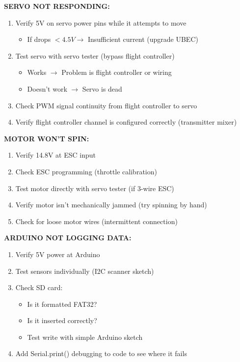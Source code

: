 \documentclass[11pt,letterpaper]{article}
\begin{document}
\textbf{SERVO NOT RESPONDING:}
\begin{enumerate}
\item Verify 5V on servo power pins while it attempts to move
\begin{itemize}[nosep]
\item If drops $< 4.5V \rightarrow$ Insufficient current (upgrade UBEC)
\end{itemize}
\item Test servo with servo tester (bypass flight controller)
\begin{itemize}[nosep]
\item Works $\rightarrow$ Problem is flight controller or wiring
\item Doesn't work $\rightarrow$ Servo is dead
\end{itemize}
\item Check PWM signal continuity from flight controller to servo
\item Verify flight controller channel is configured correctly (transmitter mixer)
\end{enumerate}

\textbf{MOTOR WON'T SPIN:}
\begin{enumerate}
\item Verify 14.8V at ESC input
\item Check ESC programming (throttle calibration)
\item Test motor directly with servo tester (if 3-wire ESC)
\item Verify motor isn't mechanically jammed (try spinning by hand)
\item Check for loose motor wires (intermittent connection)
\end{enumerate}

\textbf{ARDUINO NOT LOGGING DATA:}
\begin{enumerate}
\item Verify 5V power at Arduino
\item Test sensors individually (I2C scanner sketch)
\item Check SD card:
\begin{itemize}[nosep]
\item Is it formatted FAT32?
\item Is it inserted correctly?
\item Test write with simple Arduino sketch
\end{itemize}
\item Add Serial.print() debugging to code to see where it fails
\end{enumerate}
\end{document}
